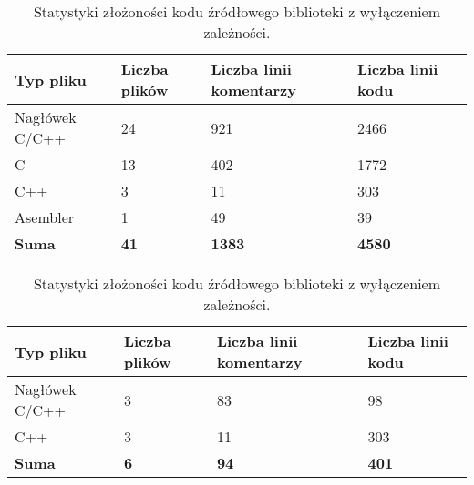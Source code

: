 \begin{table}[ht]
\centering
\caption{Statystyki złożoności kodu źródłowego}
\begin{subtable}{\textwidth}
    \centering
\begin{tabular}{|l|l|l|l|l|}
    \hline
    \textbf{Typ pliku}  &
    \textbf{Liczba plików}  &
    \textbf{Liczba linii komentarzy}  &
    \textbf{Liczba linii kodu} \\
    \hline
    Nagłówek C/C++ & 24 & 921 & 2466 \\
    \hline
    C & 13 & 402 & 1772 \\
    \hline
    C++ & 3 & 11 & 303 \\
    \hline
    Asembler & 1 & 49 & 39 \\
    \hline
    \hline
    \textbf{Suma} &
    \textbf{41} &
    \textbf{1383} &
    \textbf{4580} \\
    \hline
\end{tabular}
\caption{Statystyki złożoności kodu źródłowego biblioteki wraz z zależnościami.}
\label{tab:stats}
\end{subtable}

\begin{subtable}{\textwidth}
    \centering
\begin{tabular}{|l|l|l|l|}
    \hline
    \textbf{Typ pliku}  &
    \textbf{Liczba plików}  &
    \textbf{Liczba linii komentarzy}  &
    \textbf{Liczba linii kodu} \\
    \hline
    Nagłówek C/C++ & 3 & 83 & 98 \\
    \hline
    C++ & 3 & 11 & 303 \\
    \hline
    \hline
    \textbf{Suma} &
    \textbf{6} &
    \textbf{94} &
    \textbf{401} \\
    \hline
\end{tabular}
\caption{Statystyki złożoności kodu źródłowego biblioteki z wyłączeniem \mbox{zależności}.}
\label{tab:statssmall}
\end{subtable}
\end{table}


